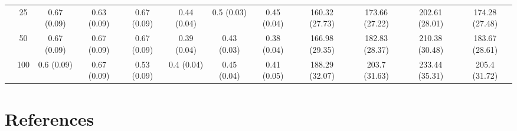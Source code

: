\documentclass[11pt,3p,review,authoryear]{elsarticle}
\theoremstyle{definition}
\begin{document}
\begin{landscape}
\begin{table}[b]
\begin{center}
{\begin{tabular}{cc|ccc|ccc|cccc|}
  & 25  & 0.67 (0.09) & 0.63 (0.09) & 0.67 (0.09) & 0.44 (0.04) & 0.5 (0.03) & 0.45 (0.04) & 160.32 (27.73) & 173.66 (27.22) & 202.61 (28.01) & 174.28 (27.48) \\ 
  & 50  & 0.67 (0.09) & 0.67 (0.09) & 0.67 (0.09) & 0.39 (0.04) & 0.43 (0.03) & 0.38 (0.04) & 166.98 (29.35) & 182.83 (28.37) & 210.38 (30.48) & 183.67 (28.61) \\ 
  & 100  & 0.6 (0.09) & 0.67 (0.09) & 0.53 (0.09) & 0.4 (0.04) & 0.45 (0.04) & 0.41 (0.05) & 188.29 (32.07) & 203.7 (31.63) & 233.44 (35.31) & 205.4 (31.72) \\
\end{tabular}}
   \end{center}
\end{table}
\end{landscape}

\section*{References}

\end{document}
